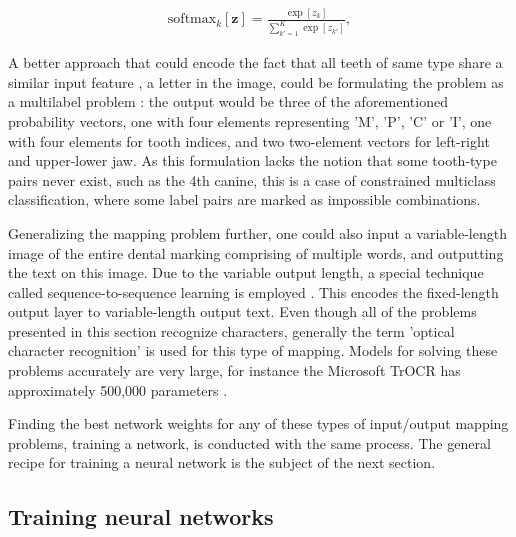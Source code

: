 \documentclass{article}
\begin{document}
\begin{align}
    \text{softmax}_k[\mathbf{z}] = \frac{\exp[z_k]}{\sum_{k'=1}^{K} \exp[z_{k'}]},
    \label{eq:softmax}
\end{align}

A better approach that could encode the fact that all teeth of same type share a similar input feature
, a letter in the image, could be formulating the problem as a multilabel
problem \cite{multilabel_classification}: the output would be three of the aforementioned 
probability vectors, one with four elements representing 'M', 'P', 'C' or 'I', one with four elements 
for tooth indices, and two two-element vectors for left-right and upper-lower jaw. As this 
formulation lacks the notion that some tooth-type pairs never exist, such as the 4th canine,
this is a case of constrained multiclass classification, where some label pairs are marked 
as impossible combinations.

Generalizing the mapping problem further, one could also input a variable-length image 
of the entire dental marking comprising of multiple words, and outputting the text on this image.
Due to the variable output length, a special technique called sequence-to-sequence learning 
is employed \cite{sutskever2014sequence}. This encodes the fixed-length output layer to variable-length 
output text. Even though all of the problems presented in this section recognize characters, 
generally the term 'optical character recognition' is used for this type of mapping. Models
for solving these problems accurately are very large, for instance the Microsoft TrOCR has approximately 
500,000 parameters \cite{li2021trocr}.

Finding the best network weights for any of these types of input/output mapping problems, training 
a network, is conducted with the same process.
The general recipe for training a neural network is the subject of the next section.

\subsection{Training neural networks}
\label{sect:training}
\end{document}
